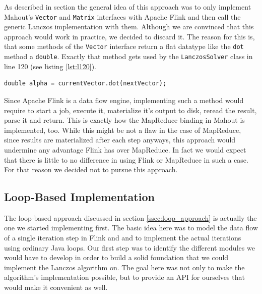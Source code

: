As described in section \label{ssec:approach_mahout} the general idea of this
approach was to only implement Mahout's \texttt{Vector} and \texttt{Matrix}
interfaces with Apache Flink and then call the generic Lanczos implementation
with them. Although we are convinced that this approach would work in practice,
we decided to discard it. The reason for this is, that some methods of the
\texttt{Vector} interface return a flat datatype like the \texttt{dot} method a
\texttt{double}. Exactly that method gets used by the \texttt{LanczosSolver}
class in line 120 (see listing \ref{lst:l120}).
\begin{lstlisting}[label=lst:l120,captionpos=b,caption=Line 120 of the
\texttt{Lanczos} class]
double alpha = currentVector.dot(nextVector);	
\end{lstlisting}
Since Apache Flink is a data flow engine, implementing such a method would
require to start a job, execute it, materialize it's output to disk, reread the
result, parse it and return. This is exactly how the MapReduce binding in
Mahout is implemented, too. While this might be not a flaw in the case of
MapReduce, since results are materialized after each step anyways, this
approach would undermine any advantage Flink has over MapReduce. In fact we
would expect that there is little to no difference in using Flink or MapReduce
in such a case. For that reason we decided not to pursue this approach.



\subsection{Loop-Based Implementation}

The loop-based approach discussed in section \ref{ssec:loop_approach} is
actually the one we started implementing first. The basic idea here was to
model the data flow of a single iteration step in Flink and and to implement
the actual iterations using ordinary Java loops. Our first step was to identify
the different modules we would have to develop in order to build a solid
foundation that we could implement the Lanczos algorithm on. The goal here was
not only to make the algorithm's implementation possible, but to provide an API
for ourselves that would make it convenient as well.


